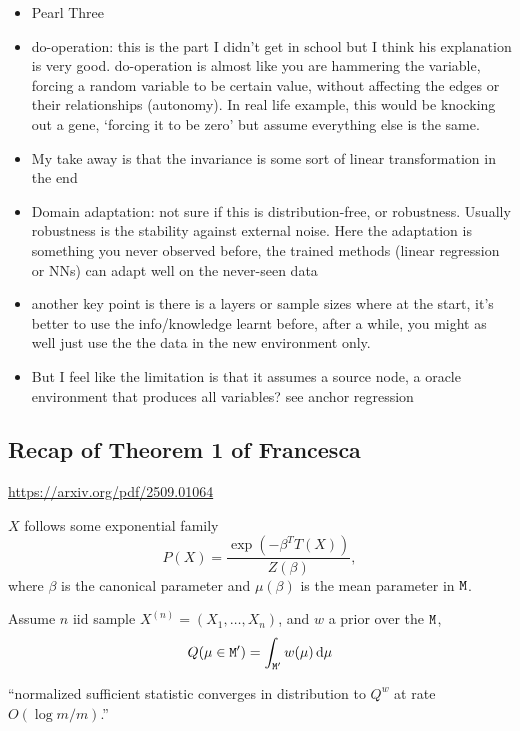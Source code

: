 \begin{itemize}
	\item Pearl Three 
	\item do-operation: this is the part I didn't get in school but I think his explanation is very good.
	do-operation is almost like you are hammering the variable,
	forcing a random variable to be certain value,
	without affecting the edges or their relationships (autonomy).
	In real life example, this would be knocking out a gene,
	`forcing it to be zero' but assume everything else is the same.
	\item My take away is that the invariance is some sort of linear transformation in the end
	\item Domain adaptation: not sure if this is distribution-free,
	or robustness.
	Usually robustness is the stability against external noise.
	Here the adaptation is something you never observed before,
	the trained methods (linear regression or NNs) can adapt well
	on the never-seen data
	\item another key point is there is a layers or sample sizes where
	at the start, it's better to use the info/knowledge learnt before,
	after a while, you might as well just use the the data in the new environment only.
	\item But I feel like the limitation is that it assumes a source node, a oracle environment that produces all variables? see anchor regression
\end{itemize}

\subsection*{Recap of Theorem 1 of Francesca}

\href{https://arxiv.org/pdf/2509.01064}{https://arxiv.org/pdf/2509.01064}

$X$ follows some exponential family
\begin{equation*}
	P(X) = \frac{\exp(-\beta^T T(X))}{Z(\beta)},
\end{equation*}
where $\beta$ is the canonical parameter and $\mu(\beta)$ is the mean parameter in $\mathtt{M}$.

Assume $n$ iid sample $X^{(n)}=(X_1,\dots,X_n)$, and $w$ a prior over the $\mathtt{M}$,
\begin{equation*}
	Q(\mu \in \Mt') = \int_{\Mt'} w(\mu) \dd{\mu}
\end{equation*}

``normalized sufficient statistic converges in distribution to $Q^{w}$ at rate $O(\log m/m)$.''

